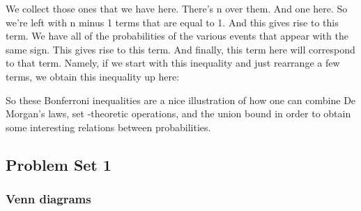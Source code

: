 \documentclass[pdftex, brazil, 12pt, twoside]{article}
\begin{document}
\begin{figure}[H]
  \begin{center}
  \end{center}
\end{figure}

We collect those ones that we have here.
There's n over them.
And one here.
So we're left with n minus 1 terms that are equal to 1.
And this gives rise to this term.
We have all of the probabilities of the various
events that appear with the same sign.
This gives rise to this term.
And finally, this term here will correspond to that term.
Namely, if we start with this inequality and just rearrange
a few terms, we obtain this inequality up here:

\begin{figure}[H]
  \begin{center}
  \end{center}
\end{figure}

So these Bonferroni inequalities are a nice
illustration of how one can combine De Morgan's laws, set
-theoretic operations, and the union bound in order to obtain
some interesting relations between probabilities.


\subsection{Problem Set 1}
\label{un1-ps1}

\subsubsection{Venn diagrams}
\label{un1-ps1-venn-diagrams}
\end{document}
